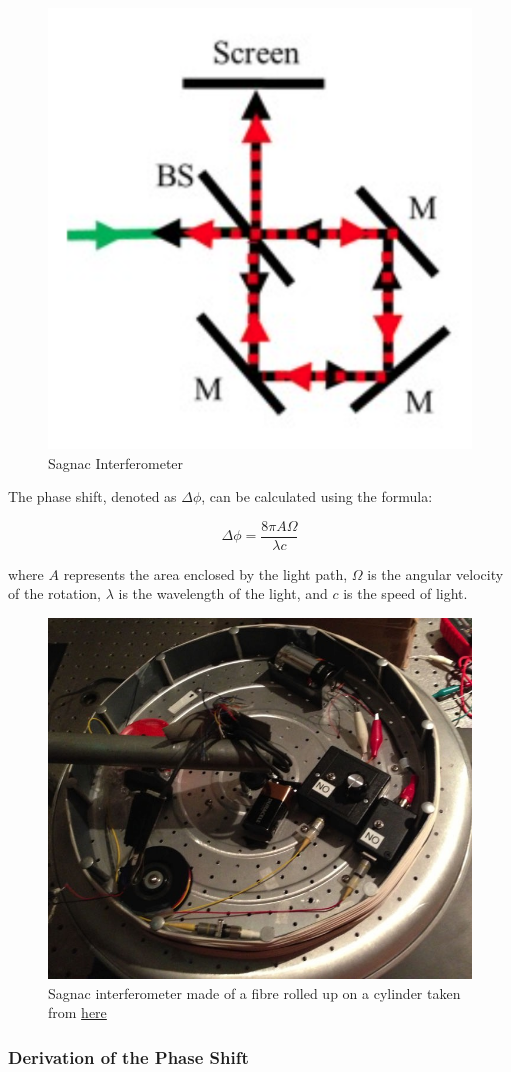 \documentclass[
  a4paper,
]{book}
\begin{document}
\begin{figure}[H]

{\centering \includegraphics[width=0.3\linewidth,height=\textheight,keepaspectratio]{wave-optics/img/sagnac.png}

}

\caption{Sagnac Interferometer}

\end{figure}%

The phase shift, denoted as \(\Delta \phi\), can be calculated using the
formula:

\[
\Delta \phi = \frac{8 \pi A \Omega}{\lambda c}
\]

where \(A\) represents the area enclosed by the light path, \(\Omega\)
is the angular velocity of the rotation, \(\lambda\) is the wavelength
of the light, and \(c\) is the speed of light.

\begin{figure}[H]

{\centering \includegraphics[width=0.5\linewidth,height=\textheight,keepaspectratio]{wave-optics/img/sagnac_exp.png}

}

\caption{Sagnac interferometer made of a fibre rolled up on a cylinder
taken from
\href{https://www.stabilock.com/holography--consulting/fiber-optic-sensors/sagnac-interferometer.html}{here}}

\end{figure}%

\subsubsection{Derivation of the Phase
Shift}\label{derivation-of-the-phase-shift-1}
\end{document}
